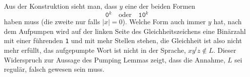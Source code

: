 \begin{loesung}
\begin{center}
\end{center}
Aus der Konstruktion sieht man, dass $y$ eine der beiden Formen
\[
\texttt{0}^k
\quad\text{oder}\quad
\texttt{10}^k
\]
haben muss (die zweite nur falls $|x|=0$).
Welche Form auch immer $y$ hat, nach dem Aufpumpen wird
auf der linken Seite des Gleichheitszeichens eine Binärzahl mit
einer führenden \texttt{1} und mit mehr Stellen stehen, die Gleichheit
ist also nicht mehr erfüllt, das aufgepumpte Wort ist nicht in der
Sprache, $xy^lz\not\in L$.
Dieser Widerspruch zur Aussage des Pumping
Lemmas zeigt, dass die Annahme, $L$ sei regulär, falsch gewesen
sein muss.
\end{loesung}


